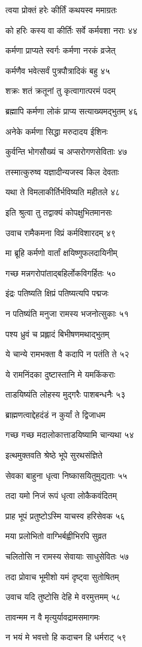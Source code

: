 त्वया प्रोक्तं हरेः कीर्तिं कथयस्व ममाग्रतः

को हरिः कस्य वा कीर्तिः सर्वे कर्मवशा नराः ४४

कर्मणा प्राप्यते स्वर्गः कर्मणा नरकं व्रजेत्

कर्मणैव भवेत्सर्वं पुत्रपौत्रादिकं बहु ४५

शक्रः शतं क्रतूनां तु कृत्वागात्परमं पदम्

ब्रह्मापि कर्मणा लोकं प्राप्य सत्याख्यमद्भुतम् ४६

अनेके कर्मणा सिद्धा मरुदादय ईशिनः

कुर्वन्ति भोगसौख्यं च अप्सरोगणसेविताः ४७

तस्मात्कुरुष्व यज्ञादीन्यजस्व किल देवताः

यथा ते विमलाकीर्तिर्भविष्यति महीतले ४८

इति श्रुत्वा तु तद्वाक्यं कोपक्षुभितमानसः

उवाच रामैकमना विप्रं कर्मविशारदम् ४९

मा ब्रूहि कर्मणो वार्तां क्षयिष्णुफलदायिनीम्

गच्छ मन्नगरोपांताद्बहिर्लोकविगर्हितः ५०

इंद्रः पतिष्यति क्षिप्रं पतिष्यत्यपि पद्मजः

न पतिष्यंति मनुजा रामस्य भजनोत्सुकाः ५१

पश्य ध्रुवं च प्रह्लादं बिभीषणमथाद्भुतम्

ये चान्ये रामभक्ता वै कदापि न पतंति ते ५२

ये रामनिंदका दुष्टास्तानि मे यमकिंकराः

ताडयिष्यंति लोहस्य मुद्गरैः पाशबन्धनैः ५३

ब्राह्मणत्वाद्देहदंडं न कुर्यां ते द्विजाधम

गच्छ गच्छ मदालोकात्ताडयिष्यामि चान्यथा ५४

इत्थमुक्तवति श्रेष्ठे भूपे सुरथसंज्ञिते

सेवका बाहुना धृत्वा निष्कासयितुमुद्यताः ५५

तदा यमो निजं रूपं धृत्वा लोकैकवंदितम्

प्राह भूपं प्रतुष्टोऽस्मि याचस्व हरिसेवक ५६

मया प्रलोभितो वाग्भिर्बह्वीभिरपि सुव्रत

चलितोसि न रामस्य सेवायाः साधुसेवितः ५७

तदा प्रोवाच भूमीशो यमं दृष्ट्वा सुतोषितम्

उवाच यदि तुष्टोसि देहि मे वरमुत्तमम् ५८

तावन्मम न वै मृत्युर्यावद्रामसमागमः

न भयं मे भवत्तो हि कदाचन हि धर्मराट् ५९

